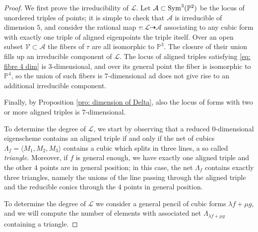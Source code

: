 \documentclass{amsart}
\theoremstyle{plain}
\theoremstyle{definition}
\newcommand{\p}{\mathbb{P}}
\newcommand{\sL}{\mathcal{L}}
\newcommand{\sA}{\mathcal{A}}
\newcommand{\sV}{\mathcal{V}}
\begin{document}
\begin{proof}
We first prove the irreducibility of $\sL$.
Let $\sA \subset {\rm Sym}^3(\p^2 )$ be the locus of unordered triples of points; it is simple to check that $\sA$ is irreducible of dimension $5$, and consider the rational map $\tau:\sL \dasharrow \sA$
associating to any cubic form with exactly one triple of aligned eigenpoints the triple itself. Over an open subset $\sV \subset \sA$ the fibers of $\tau$ are all isomorphic to $\p^3$. The closure of their union fills up an irreducible component of $\sL$. The locus of aligned triples satisfying \eqref{eq: fibre 4 dim} is $3$-dimensional, and over its general point the fiber is isomorphic to $\p^4$, so the union of such fibers is $7$-dimensional ad does not give rise to an additional irreducible component.

Finally, by Proposition \ref{pro: dimension of Delta}, also the locus of forms with two or more aligned triples is $7$-dimensional.


To determine the degree of $\sL$, we start by observing that a reduced $0$-dimensional eigenscheme contains an aligned triple if and only if the net of cubics $\Lambda_f = \langle M_1, M_2, M_3 \rangle$ contains a cubic which splits in three lines, a so called {\it triangle}. Moreover, if $f$ is general enough, we have exactly one aligned triple and the other $4$ points are in general position; in this case, the net $\Lambda_f$ contains exactly three triangles, namely the unions of the line passing through the aligned triple and the reducible conics through the $4$ points in general position.

To determine the degree of $\mathcal L$ we consider a general pencil of cubic forms $\lambda f + \mu g$, and we will compute the number of elements with associated net $\Lambda_{\lambda f + \mu g}$ containing a triangle.


\end{proof}
\end{document}

